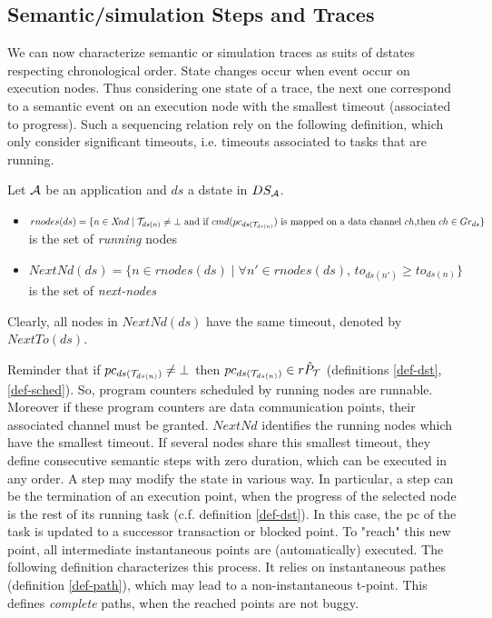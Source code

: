 \documentclass{article}
\begin{document}
\subsection{Semantic/simulation Steps and Traces}\label{sec-traces}
We can now characterize semantic or simulation traces as suits of dstates respecting chronological order. State changes occur when event occur on execution nodes. Thus considering one state
of a trace, the next one correspond to a semantic event on an execution node with the smallest timeout (associated to progress). Such a sequencing relation rely on the following definition, which only consider significant timeouts, i.e. timeouts associated to tasks that are running.
\begin{definition}\label{def-nxtnd} Let ${\cal A}$ be an application and $ds$ a dstate in $DS_{\cal A}$.
\begin{itemize}
\item $rnodes(ds)= \{n\in X\!nd\mid {\cal T}_{ds(n)}\neq \bot \mbox{ and if $cmd(pc_{ds({\cal T}_{ds(n)}})$ is mapped on a data channel $ch$,}\\ \mbox{then $ch\in Gr_{ds}$} \}$ is the set of {\em running} nodes
\item $NextN\!d(ds)=\{n\in rnodes(ds)\mid \forall n'\in rnodes(ds),\,to_{ds(n')}\geq to_{ds(n)}\}$ is the set of {\em next-nodes}
\end{itemize}
Clearly, all nodes in $NextN\!d(ds)$ have the same timeout, denoted by $NextT\!o(ds)$.
\end{definition}
Reminder that if $pc_{ds({\cal T}_{ds(n)})}\neq \bot$ then $pc_{ds({\cal T}_{ds(n)})}\in r\hat P_{\cal T}$ (definitions \ref{def-dst}, \ref{def-sched}). So, program counters scheduled by running nodes are runnable. Moreover if these program counters are data communication points, their associated channel must be granted. $NextN\!d$ identifies the running nodes which have the smallest timeout. If several nodes share this smallest timeout, they define consecutive semantic steps with zero duration, which can be executed in any order. A step may modify the state in various way. In particular, a step can be the termination of an execution point, when the progress of the selected node is the rest of its running task (c.f. definition \ref{def-dst}). In this case, the pc of the task is updated to a successor transaction or blocked point. To "reach" this new point, all intermediate instantaneous points are (automatically) executed. The following definition characterizes this process. It relies on instantaneous pathes (definition \ref{def-path}), which may lead to a non-instantaneous t-point. This defines {\em complete} paths, when the reached points are not buggy. 
\end{document}
